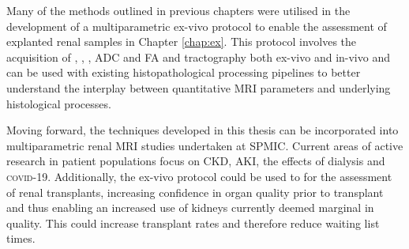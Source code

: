 Many of the methods outlined in previous chapters were utilised in the development of a multiparametric ex-vivo protocol to enable the assessment of explanted renal samples in Chapter \ref{chap:ex}. This protocol involves the acquisition of \tone, \ttwo, \ttwostar, \ac{ADC} and \ac{FA} and tractography both ex-vivo and in-vivo and can be used with existing histopathological processing pipelines to better understand the interplay between quantitative \ac{MRI} parameters and underlying histological processes. 

Moving forward, the techniques developed in this thesis can be incorporated into multiparametric renal \ac{MRI} studies undertaken at \ac{SPMIC}. Current areas of active research in patient populations focus on \ac{CKD}, \ac{AKI}, the effects of dialysis and \textsc{covid}-19. Additionally, the ex-vivo protocol could be used to for the assessment of renal transplants, increasing confidence in organ quality prior to transplant and thus enabling an increased use of kidneys currently deemed marginal in quality. This could increase transplant rates and therefore reduce waiting list times.